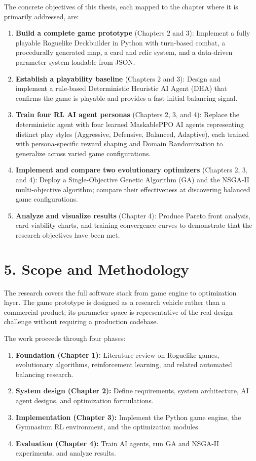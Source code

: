 The concrete objectives of this thesis, each mapped to the chapter where it is primarily addressed, are:
\begin{enumerate}
    \item \textbf{Build a complete game prototype} (Chapters 2 and 3): Implement a fully playable Roguelike Deckbuilder in Python with turn-based combat, a procedurally generated map, a card and relic system, and a data-driven parameter system loadable from JSON.
    \item \textbf{Establish a playability baseline} (Chapters 2 and 3): Design and implement a rule-based Deterministic Heuristic AI Agent (DHA) that confirms the game is playable and provides a fast initial balancing signal.
    \item \textbf{Train four RL AI agent personas} (Chapters 2, 3, and 4): Replace the deterministic agent with four learned MaskablePPO AI agents representing distinct play styles (Aggressive, Defensive, Balanced, Adaptive), each trained with persona-specific reward shaping and Domain Randomization to generalize across varied game configurations.
    \item \textbf{Implement and compare two evolutionary optimizers} (Chapters 2, 3, and 4): Deploy a Single-Objective Genetic Algorithm (GA) and the NSGA-II multi-objective algorithm; compare their effectiveness at discovering balanced game configurations.
    \item \textbf{Analyze and visualize results} (Chapter 4): Produce Pareto front analysis, card viability charts, and training convergence curves to demonstrate that the research objectives have been met.
\end{enumerate}

\section*{5. Scope and Methodology}

The research covers the full software stack from game engine to optimization layer. The game prototype is designed as a research vehicle rather than a commercial product; its parameter space is representative of the real design challenge without requiring a production codebase.

The work proceeds through four phases:
\begin{enumerate}
    \item \textbf{Foundation (Chapter 1):} Literature review on Roguelike games, evolutionary algorithms, reinforcement learning, and related automated balancing research.
    \item \textbf{System design (Chapter 2):} Define requirements, system architecture, AI agent designs, and optimization formulations.
    \item \textbf{Implementation (Chapter 3):} Implement the Python game engine, the Gymnasium RL environment, and the optimization modules.
    \item \textbf{Evaluation (Chapter 4):} Train AI agents, run GA and NSGA-II experiments, and analyze results.
\end{enumerate}

